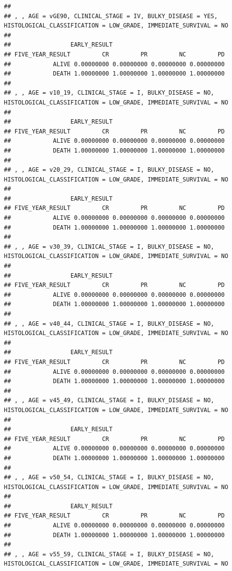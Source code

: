 \documentclass[]{article}
\begin{document}
\begin{verbatim}
## 
## , , AGE = vGE90, CLINICAL_STAGE = IV, BULKY_DISEASE = YES, HISTOLOGICAL_CLASSIFICATION = LOW_GRADE, IMMEDIATE_SURVIVAL = NO
## 
##                 EARLY_RESULT
## FIVE_YEAR_RESULT         CR         PR         NC         PD
##            ALIVE 0.00000000 0.00000000 0.00000000 0.00000000
##            DEATH 1.00000000 1.00000000 1.00000000 1.00000000
## 
## , , AGE = v10_19, CLINICAL_STAGE = I, BULKY_DISEASE = NO, HISTOLOGICAL_CLASSIFICATION = LOW_GRADE, IMMEDIATE_SURVIVAL = NO
## 
##                 EARLY_RESULT
## FIVE_YEAR_RESULT         CR         PR         NC         PD
##            ALIVE 0.00000000 0.00000000 0.00000000 0.00000000
##            DEATH 1.00000000 1.00000000 1.00000000 1.00000000
## 
## , , AGE = v20_29, CLINICAL_STAGE = I, BULKY_DISEASE = NO, HISTOLOGICAL_CLASSIFICATION = LOW_GRADE, IMMEDIATE_SURVIVAL = NO
## 
##                 EARLY_RESULT
## FIVE_YEAR_RESULT         CR         PR         NC         PD
##            ALIVE 0.00000000 0.00000000 0.00000000 0.00000000
##            DEATH 1.00000000 1.00000000 1.00000000 1.00000000
## 
## , , AGE = v30_39, CLINICAL_STAGE = I, BULKY_DISEASE = NO, HISTOLOGICAL_CLASSIFICATION = LOW_GRADE, IMMEDIATE_SURVIVAL = NO
## 
##                 EARLY_RESULT
## FIVE_YEAR_RESULT         CR         PR         NC         PD
##            ALIVE 0.00000000 0.00000000 0.00000000 0.00000000
##            DEATH 1.00000000 1.00000000 1.00000000 1.00000000
## 
## , , AGE = v40_44, CLINICAL_STAGE = I, BULKY_DISEASE = NO, HISTOLOGICAL_CLASSIFICATION = LOW_GRADE, IMMEDIATE_SURVIVAL = NO
## 
##                 EARLY_RESULT
## FIVE_YEAR_RESULT         CR         PR         NC         PD
##            ALIVE 0.00000000 0.00000000 0.00000000 0.00000000
##            DEATH 1.00000000 1.00000000 1.00000000 1.00000000
## 
## , , AGE = v45_49, CLINICAL_STAGE = I, BULKY_DISEASE = NO, HISTOLOGICAL_CLASSIFICATION = LOW_GRADE, IMMEDIATE_SURVIVAL = NO
## 
##                 EARLY_RESULT
## FIVE_YEAR_RESULT         CR         PR         NC         PD
##            ALIVE 0.00000000 0.00000000 0.00000000 0.00000000
##            DEATH 1.00000000 1.00000000 1.00000000 1.00000000
## 
## , , AGE = v50_54, CLINICAL_STAGE = I, BULKY_DISEASE = NO, HISTOLOGICAL_CLASSIFICATION = LOW_GRADE, IMMEDIATE_SURVIVAL = NO
## 
##                 EARLY_RESULT
## FIVE_YEAR_RESULT         CR         PR         NC         PD
##            ALIVE 0.00000000 0.00000000 0.00000000 0.00000000
##            DEATH 1.00000000 1.00000000 1.00000000 1.00000000
## 
## , , AGE = v55_59, CLINICAL_STAGE = I, BULKY_DISEASE = NO, HISTOLOGICAL_CLASSIFICATION = LOW_GRADE, IMMEDIATE_SURVIVAL = NO

\end{verbatim}
\end{document}
